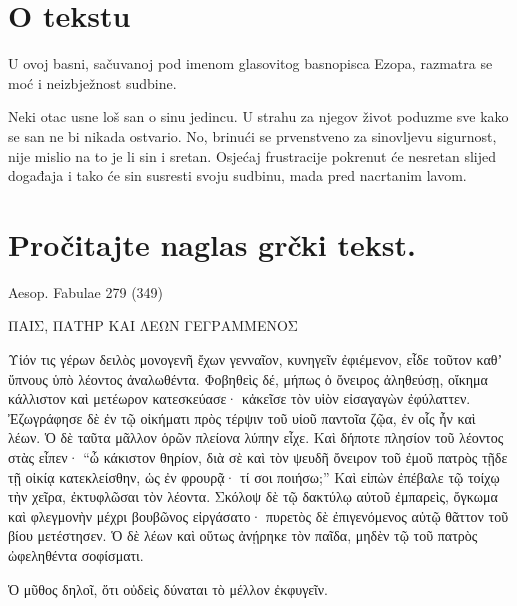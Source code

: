 


\section*{O tekstu}

U ovoj basni, sačuvanoj pod imenom glasovitog basnopisca Ezopa, razmatra se moć i neizbježnost sudbine.

Neki otac usne loš san o sinu jedincu. U strahu za njegov život poduzme sve kako se san ne bi nikada ostvario. No, brinući se prvenstveno za sinovljevu sigurnost, nije mislio na to je li sin i sretan. Osjećaj frustracije pokrenut će nesretan slijed događaja i tako će sin susresti svoju sudbinu, mada pred nacrtanim lavom.


\section*{Pročitajte naglas grčki tekst.}

Aesop. Fabulae 279 (349)


\medskip


{\large

\begin{greek}

\noindent ΠΑΙΣ, ΠΑΤΗΡ ΚΑΙ ΛΕΩΝ ΓΕΓΡΑΜΜΕΝΟΣ

\medskip

\noindent Υἱόν τις γέρων δειλὸς μονογενῆ ἔχων γενναῖον, κυνηγεῖν ἐφιέμενον, εἶδε τοῦτον καθʼ ὕπνους ὑπὸ λέοντος ἀναλωθέντα. Φοβηθεὶς δέ, μήπως ὁ ὄνειρος ἀληθεύσῃ, οἴκημα κάλλιστον καὶ μετέωρον κατεσκεύασε· κἀκεῖσε τὸν υἱὸν εἰσαγαγὼν ἐφύλαττεν. Ἐζωγράφησε δὲ ἐν τῷ οἰκήματι πρὸς τέρψιν τοῦ υἱοῦ παντοῖα ζῷα, ἐν οἷς ἦν καὶ λέων. Ὁ δὲ ταῦτα μᾶλλον ὁρῶν πλείονα λύπην εἶχε. Καὶ δήποτε πλησίον τοῦ λέοντος στὰς εἶπεν· ``ὦ κάκιστον θηρίον, διὰ σὲ καὶ τὸν ψευδῆ ὄνειρον τοῦ ἐμοῦ πατρὸς τῇδε τῇ οἰκίᾳ κατεκλείσθην, ὡς ἐν φρουρᾷ· τί σοι ποιήσω;'' Καὶ εἰπὼν ἐπέβαλε τῷ τοίχῳ τὴν χεῖρα, ἐκτυφλῶσαι τὸν λέοντα. Σκόλοψ δὲ τῷ δακτύλῳ αὐτοῦ ἐμπαρεὶς, ὄγκωμα καὶ φλεγμονὴν μέχρι βουβῶνος εἰργάσατο· πυρετὸς δὲ ἐπιγενόμενος αὐτῷ θᾶττον τοῦ βίου μετέστησεν. Ὁ δὲ λέων καὶ οὕτως ἀνῄρηκε τὸν παῖδα, μηδὲν τῷ τοῦ πατρὸς ὠφεληθέντα σοφίσματι.

Ὁ μῦθος δηλοῖ, ὅτι οὐδεὶς δύναται τὸ μέλλον ἐκφυγεῖν.

\end{greek}

}


